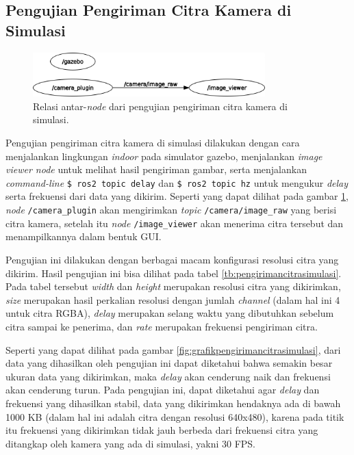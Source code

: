 \subsection{Pengujian Pengiriman Citra Kamera di Simulasi}
\label{subsec:citrasimulasi}

\begin{figure}[ht]
  \centering
  \includegraphics[width=0.8\textwidth,keepaspectratio]{gambar/rosgraph-camera-plugin.png}
  \caption{Relasi antar-\emph{node} dari pengujian pengiriman citra kamera di simulasi.}
  \label{fig:rosgraphcameraplugin}
\end{figure}

Pengujian pengiriman citra kamera di simulasi dilakukan dengan cara menjalankan lingkungan \emph{indoor} pada simulator gazebo,
  menjalankan \emph{image viewer node} untuk melihat hasil pengiriman gambar,
  serta menjalankan \emph{command-line} \lstinline{$ ros2 topic delay} dan \lstinline{$ ros2 topic hz} untuk mengukur \emph{delay} serta frekuensi dari data yang dikirim.
Seperti yang dapat dilihat pada gambar \ref{fig:rosgraphcameraplugin},
  \emph{node} \lstinline{/camera_plugin} akan mengirimkan \emph{topic} \lstinline{/camera/image_raw} yang berisi citra kamera,
  setelah itu \emph{node} \lstinline{/image_viewer} akan menerima citra tersebut dan menampilkannya dalam bentuk GUI.

Pengujian ini dilakukan dengan berbagai macam konfigurasi resolusi citra yang dikirim.
Hasil pengujian ini bisa dilihat pada tabel \ref{tb:pengirimancitrasimulasi}.
Pada tabel tersebut \emph{width} dan \emph{height} merupakan resolusi citra yang dikirimkan,
  \emph{size} merupakan hasil perkalian resolusi dengan jumlah \emph{channel} (dalam hal ini 4 untuk citra RGBA),
  \emph{delay} merupakan selang waktu yang dibutuhkan sebelum citra sampai ke penerima,
  dan \emph{rate} merupakan frekuensi pengiriman citra.



Seperti yang dapat dilihat pada gambar \ref{fig:grafikpengirimancitrasimulasi},
  dari data yang dihasilkan oleh pengujian ini dapat diketahui bahwa semakin besar ukuran data yang dikirimkan,
  maka \emph{delay} akan cenderung naik dan frekuensi akan cenderung turun.
Pada pengujian ini, dapat diketahui agar \emph{delay} dan frekuensi yang dihasilkan stabil,
  data yang dikirimkan hendaknya ada di bawah 1000 KB (dalam hal ini adalah citra dengan resolusi 640x480),
  karena pada titik itu frekuensi yang dikirimkan tidak jauh berbeda dari frekuensi citra yang ditangkap oleh kamera yang ada di simulasi, yakni 30 FPS.


